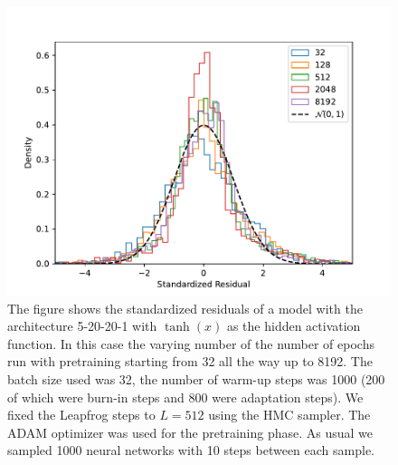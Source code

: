 \begin{figure}[h!]
    \centering
    \includegraphics[scale=0.7]{figures/standardized_residuals/effect_of_pretraining/standardized_residuals_hmc_vs_pretraining_steps.pdf}
    \caption{The figure shows the standardized residuals of a model with the architecture 5-20-20-1 with $\tanh(x)$ as the
    hidden activation function. In this case the varying number of the number of epochs run with pretraining starting from 32 all the way up to 8192. The batch size used was 32, the number of warm-up steps was 1000 (200 of which were burn-in steps and 800 were adaptation steps). We fixed the Leapfrog steps to $L = 512$ using the HMC sampler. The ADAM optimizer was used for the pretraining phase. As usual we sampled 1000 neural networks with 10 steps between each sample.
    }
    \label{fig:std_residual_vs_pretraining}
\end{figure}

